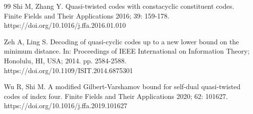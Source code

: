 \documentclass[11pt]{amsart}
\theoremstyle{plain}
\theoremstyle{definition}
\numberwithin{equation}{section}
\begin{document}
\begin{thebibliography}{99}
 Shi M, Zhang Y. Quasi-twisted codes with constacyclic constituent codes. Finite Fields and Their Applications 2016; 39: 159-178. https://doi.org/10.1016/j.ffa.2016.01.010

 Zeh A, Ling S. Decoding of quasi-cyclic codes up to a new lower bound on the minimum distance. In: Proceedings of IEEE International on Information Theory; Honolulu, HI, USA; 2014. pp. 2584-2588. https://doi.org/10.1109/ISIT.2014.6875301

 Wu R, Shi M. A modified Gilbert-Varshamov bound for self-dual quasi-twisted codes of index four. Finite Fields and Their Applications 2020; 62: 101627. https://doi.org/10.1016/j.ffa.2019.101627

\end{thebibliography}
\end{document}
